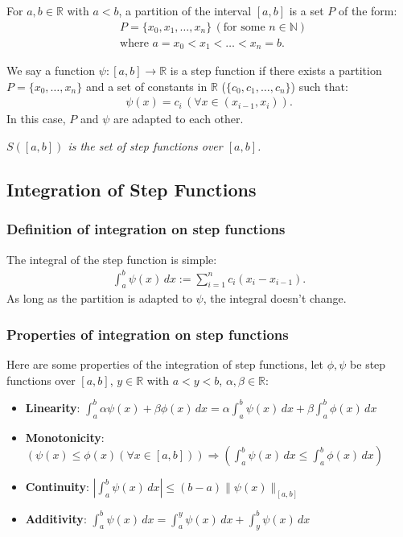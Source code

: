 \documentclass[a4paper, 12pt, twoside]{article}
\begin{document}
For $a, b \in \mathbb{R}$ with $a < b$, a partition of the interval
$[a,b]$ is a set $P$ of the form:
\begin{align*}
       & P = \{x_0, x_1, \ldots, x_n\} \, (\text{for some } n \in \mathbb{N}) \\
       & \text{where } a = x_0 < x_1 < \ldots < x_n = b.
\end{align*}

We say a function $\psi:[a,b]\to\mathbb{R}$ is a step function if
there exists a partition $P = \{x_0, \ldots, x_n\}$ and a set of constants in
$\mathbb{R}$ ($\{c_0, c_1, \ldots, c_n\}$) such that:
\begin{align*}
      \psi(x) = c_i \, (\forall x \in (x_{i-1}, x_i)).
\end{align*}
In this case, $P$ and $\psi$ are adapted to each other.

\vspace{\baselineskip}

\textit{$S([a, b])$ is the set of step functions over $[a, b]$.}

\subsection{Integration of Step Functions}

\subsubsection{Definition of integration on step functions}

The integral of the step function is simple:
\begin{align*}
      \int_a^b \psi(x) \, dx := \sum_{i = 1}^n c_i(x_i - x_{i-1}).
\end{align*}
As long as the partition is adapted to $\psi$, the integral doesn't
change.

\subsubsection{Properties of integration on step functions}

Here are some properties of the integration of step functions, let
$\phi, \psi$ be step functions over $[a, b]$, $y \in \mathbb{R}$
with $a < y < b$, $\alpha, \beta \in \mathbb{R}$:

\begin{itemize}
      \item \textbf{Linearity}: $\int_a^b \alpha \psi(x) + \beta \phi(x)
                  \, dx = \alpha \int_a^b \psi(x) \, dx + \beta \int_a^b
                  \phi(x) \, dx$
      \item \textbf{Monotonicity}: $(\psi(x) \leq \phi(x) (\forall
                  x \in [a, b])) \Rightarrow (\int_a^b \psi(x) \, dx
                  \leq \int_a^b \phi(x) \, dx)$
      \item \textbf{Continuity}: $|\int_a^b \psi(x) \, dx| \leq (b-a)
                  \|\psi(x)\|_{[a, b]}$
      \item \textbf{Additivity}: $\int_a^b \psi(x) \, dx = \int_a^y
                  \psi(x) \, dx + \int_y^b \psi(x) \, dx$
\end{itemize}
\end{document}
